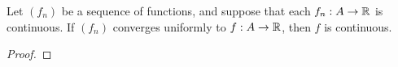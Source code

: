 \documentclass[../main.tex]{subfiles}
\begin{document}
\begin{theorem}\label{trm:17.6}
    Let $(f_n)$ be a sequence of functions, and suppose that each $f_n:A\to\mathbb{R}$ is continuous. If $(f_n)$ converges uniformly to $f:A\to\mathbb{R}$, then $f$ is continuous.
    \begin{proof}


\end{proof}
\end{theorem}
\end{document}
